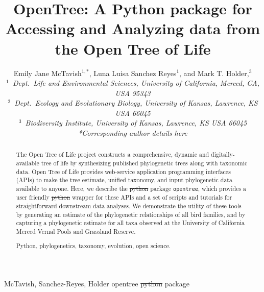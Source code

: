 \documentclass[oupdraft]{sysbio_sse}
\providecommand{\DIFadd}[1]{{\protect\color{blue}\uwave{#1}}} %
\providecommand{\DIFdel}[1]{{\protect\color{red}\sout{#1}}}                      %
\providecommand{\DIFaddbegin}{} %
\providecommand{\DIFaddend}{} %
\providecommand{\DIFdelbegin}{} %
\providecommand{\DIFdelend}{} %
\begin{document}
\title{OpenTree: A Python package for Accessing and Analyzing data from the Open Tree of Life}

\author{Emily Jane McTavish$^{1,\ast}$, Luna Luisa Sanchez Reyes$^{1}$, and
Mark T. Holder,$^{3}$\\[4pt]
\textit{$^{1}$~Dept.~Life and Environmental Sciences, University of California, Merced, CA, USA 95343}
\\
\textit{$^{2}$~Dept.~Ecology and Evolutionary Biology, University of Kansas, Lawrence, KS USA 66045}\\
\textit{$^{3}$~Biodiversity Institute, University of Kansas, Lawrence, KS USA 66045}
\\[2pt]
\textit{*Corresponding author details here}}

\markboth%
{McTavish, Sanchez-Reyes, Holder}
{opentree \DIFdelbegin \DIFdel{python }\DIFdelend \DIFaddbegin \DIFadd{Python }\DIFaddend package}

\maketitle

\begin{abstract}
{The Open Tree of Life project constructs a comprehensive, dynamic and digitally-available tree of life by synthesizing published phylogenetic trees along with taxonomic data.
Open Tree of Life provides web-service application programming interfaces (APIs) to make the tree estimate, unified taxonomy, and input phylogenetic data available to anyone.
Here, we describe the \DIFdelbegin \DIFdel{python }\DIFdelend \DIFaddbegin \DIFadd{Python }\DIFaddend package \texttt{opentree}, which provides a user friendly \DIFdelbegin \DIFdel{python }\DIFdelend \DIFaddbegin \DIFadd{Python }\DIFaddend wrapper for these APIs and a set of scripts and tutorials for straightforward downstream data analyses.
We demonstrate the utility of these tools by generating an estimate of the phylogenetic relationships of all bird families, and by capturing a phylogenetic estimate for all taxa  observed at the University of California Merced Vernal Pools and Grassland Reserve.
}

{Python, phylogenetics, taxonomy, evolution, open science.}
\end{abstract}
\newline
\end{document}
